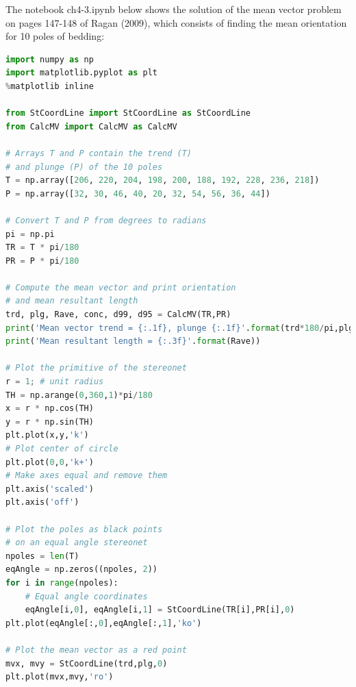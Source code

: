 \documentclass[a4paper , 12pt]{book}
\begin{document}
The notebook ch4-3.ipynb below shows the solution of the mean vector problem on pages 147-148 of Ragan (2009), which consists of finding the mean orientation for 10 poles of bedding:

\begin{center}
\begin{lstlisting}[language=Python, frame=single]
import numpy as np
import matplotlib.pyplot as plt
%matplotlib inline

from StCoordLine import StCoordLine as StCoordLine
from CalcMV import CalcMV as CalcMV 

# Arrays T and P contain the trend (T) 
# and plunge (P) of the 10 poles
T = np.array([206, 220, 204, 198, 200, 188, 192, 228, 236, 218])
P = np.array([32, 30, 46, 40, 20, 32, 54, 56, 36, 44])

# Convert T and P from degrees to radians
pi = np.pi
TR = T * pi/180
PR = P * pi/180

# Compute the mean vector and print orientation
# and mean resultant length
trd, plg, Rave, conc, d99, d95 = CalcMV(TR,PR)
print('Mean vector trend = {:.1f}, plunge {:.1f}'.format(trd*180/pi,plg*180/pi))
print('Mean resultant length = {:.3f}'.format(Rave))

# Plot the primitive of the stereonet
r = 1; # unit radius
TH = np.arange(0,360,1)*pi/180
x = r * np.cos(TH)
y = r * np.sin(TH)
plt.plot(x,y,'k')
# Plot center of circle
plt.plot(0,0,'k+')
# Make axes equal and remove them
plt.axis('scaled')
plt.axis('off')

# Plot the poles as black points
# on an equal angle stereonet
npoles = len(T)
eqAngle = np.zeros((npoles, 2))
for i in range(npoles):
    # Equal angle coordinates
    eqAngle[i,0], eqAngle[i,1] = StCoordLine(TR[i],PR[i],0)
plt.plot(eqAngle[:,0],eqAngle[:,1],'ko')

# Plot the mean vector as a red point
mvx, mvy = StCoordLine(trd,plg,0)
plt.plot(mvx,mvy,'ro')
\end{lstlisting}
\end{center}
\end{document}
